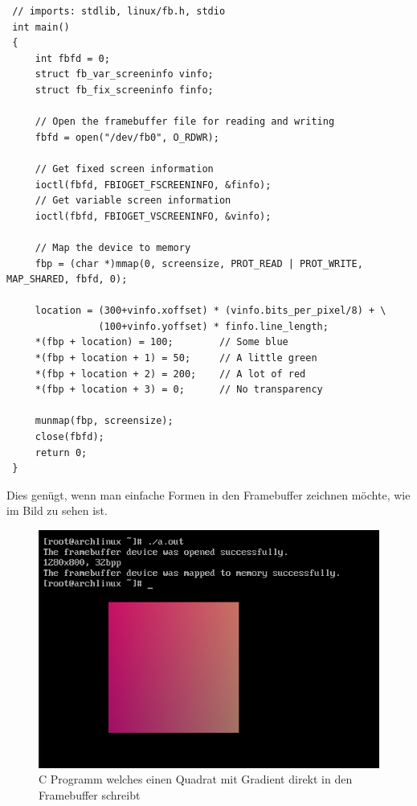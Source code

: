 \begin{verbatim}
 // imports: stdlib, linux/fb.h, stdio
 int main()
 {
     int fbfd = 0;
     struct fb_var_screeninfo vinfo;
     struct fb_fix_screeninfo finfo;
     
     // Open the framebuffer file for reading and writing
     fbfd = open("/dev/fb0", O_RDWR);
          
     // Get fixed screen information
     ioctl(fbfd, FBIOGET_FSCREENINFO, &finfo);
     // Get variable screen information
     ioctl(fbfd, FBIOGET_VSCREENINFO, &vinfo);
  
     // Map the device to memory
     fbp = (char *)mmap(0, screensize, PROT_READ | PROT_WRITE, MAP_SHARED, fbfd, 0);
 
     location = (300+vinfo.xoffset) * (vinfo.bits_per_pixel/8) + \
                (100+vinfo.yoffset) * finfo.line_length;
     *(fbp + location) = 100;        // Some blue
     *(fbp + location + 1) = 50;     // A little green
     *(fbp + location + 2) = 200;    // A lot of red
     *(fbp + location + 3) = 0;      // No transparency

     munmap(fbp, screensize);
     close(fbfd);
     return 0;
 }
\end{verbatim}
Dies genügt, wenn man einfache Formen in den Framebuffer zeichnen möchte, wie im Bild zu sehen ist.
\begin{figure}[h]
  \centering
  \includegraphics[scale=0.7]{realisierung/images/framebuffer-rectangle.png}
  \caption{C Programm welches einen Quadrat mit Gradient direkt in den Framebuffer schreibt}
\end{figure}

